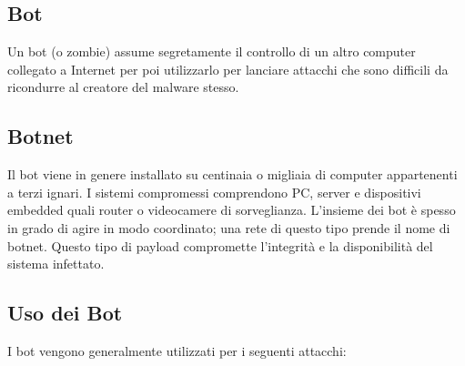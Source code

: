 \subsection{Bot}

Un bot (o zombie) assume segretamente il controllo di un altro computer collegato a Internet per poi utilizzarlo per lanciare attacchi che sono difficili da ricondurre al creatore del malware stesso.

\subsection{Botnet}

Il bot viene in genere installato su centinaia o migliaia di computer appartenenti a terzi ignari. I sistemi compromessi comprendono PC, server e dispositivi embedded quali router o videocamere di sorveglianza. L'insieme dei bot è spesso in grado di agire in modo coordinato; una rete di questo tipo prende il nome di botnet. Questo tipo di payload compromette l'integrità e la disponibilità del sistema infettato.

\subsection{Uso dei Bot}

I bot vengono generalmente utilizzati per i seguenti attacchi:

